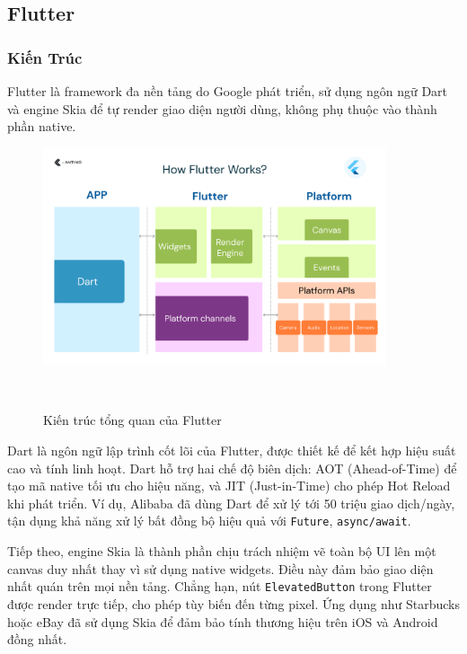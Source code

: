 \subsection{Flutter}
\renewcommand{\labelitemi}{--}    
\subsubsection{Kiến Trúc}

\hspace*{1.5em}Flutter là framework đa nền tảng do Google phát triển, sử dụng ngôn ngữ Dart và engine Skia để tự render giao diện người dùng, không phụ thuộc vào thành phần native.

\begin{figure}[H]
    \centering
    \includegraphics[width=0.9\textwidth]{images/flutter.png}
    \caption{Kiến trúc tổng quan của Flutter} ~\cite{flutter-impeller}
\end{figure}

Dart là ngôn ngữ lập trình cốt lõi của Flutter, được thiết kế để kết hợp hiệu suất cao và tính linh hoạt.  
Dart hỗ trợ hai chế độ biên dịch: AOT (Ahead-of-Time) để tạo mã native tối ưu cho hiệu năng, và JIT (Just-in-Time) cho phép Hot Reload khi phát triển.  
Ví dụ, Alibaba đã dùng Dart để xử lý tới 50 triệu giao dịch/ngày, tận dụng khả năng xử lý bất đồng bộ hiệu quả với \texttt{Future}, \texttt{async/await}.

Tiếp theo, engine Skia là thành phần chịu trách nhiệm vẽ toàn bộ UI lên một canvas duy nhất thay vì sử dụng native widgets.  
Điều này đảm bảo giao diện nhất quán trên mọi nền tảng.  
Chẳng hạn, nút \texttt{ElevatedButton} trong Flutter được render trực tiếp, cho phép tùy biến đến từng pixel.  
Ứng dụng như Starbucks hoặc eBay đã sử dụng Skia để đảm bảo tính thương hiệu trên iOS và Android đồng nhất.

